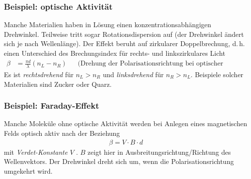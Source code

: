 \subsubsection{Beispiel: optische Aktivität}
Manche Materialien haben in Lösung einen konzentrationsabhängigen
Drehwinkel. Teilweise tritt sogar Rotationsdispersion auf (der
Drehwinkel ändert sich je nach Wellenlänge).
Der Effekt beruht auf zirkularer Doppelbrechung, d.\,h. einen
Unterschied des Brechungsindex für rechts- und linkszirkulares
Licht
\begin{align*}
  \beta &= \frac{\pi d}{\lambda}(n_L-n_R)
  && \text{(Drehung der Polarisationsrichtung bei optischer Achse)}
\end{align*}%
%
Es ist \emph{rechtsdrehend} für $n_L>n_R$ 
und \emph{linksdrehend} für $n_R>n_L$.
Beispiele solcher Materialien sind Zucker oder Quarz.

\subsubsection{Beispiel: Faraday-Effekt}
Manche Moleküle ohne optische Aktivität werden bei Anlegen eines
magnetischen Felds optisch aktiv nach der Beziehung
\begin{gather*}
  \beta = V\cdot B\cdot d
\end{gather*}
mit
\emph{Verdet-Konstante} $V$%
%
.
$B$ zeigt hier in Ausbreitungsrichtung/Richtung des Wellenvektors.
Der Drehwinkel dreht sich um, wenn die Polarisationsrichtung umgekehrt
wird.


